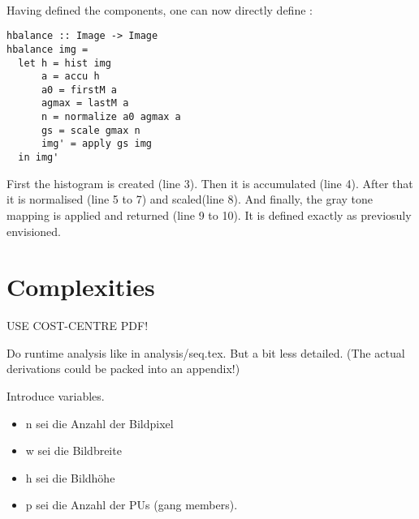   \paragraph{\algo}
  Having defined the components, one can now directly define \seq:
  \begin{lstlisting}
hbalance :: Image -> Image
hbalance img =
  let h = hist img
      a = accu h
      a0 = firstM a
      agmax = lastM a
      n = normalize a0 agmax a
      gs = scale gmax n
      img' = apply gs img
  in img'
  \end{lstlisting}
  First the histogram is created (line 3). Then it is accumulated (line 4).
  After that it is normalised (line 5 to 7) and scaled(line 8).
  And finally, the gray tone mapping is applied and returned (line 9 to 10).
  It is defined exactly as previosuly envisioned.
  
\section{Complexities}
  USE COST-CENTRE PDF!
  
  Do runtime analysis like in analysis/seq.tex. But a bit less detailed.
  (The actual derivations could be packed into an appendix!)
  
  
  Introduce variables.
  \begin{itemize}
    \item n sei die Anzahl der Bildpixel
    \item w sei die Bildbreite
    \item h sei die Bildhöhe
    \item p sei die Anzahl der PUs (gang members).
  \end{itemize}
